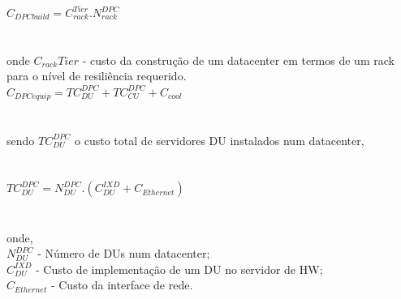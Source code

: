 \documentclass[t]{beamer}
\begin{document}
{%
\begin{frame}
$C_{DPCbuild} = C_{rack}^{Tier} . N_{rack}^{DPC}$\\
\\~\\
onde $C_{rack}{Tier}$ - custo da construção de um datacenter em termos de um rack para o nível de resiliência requerido.\\
\vspace{0.5cm}
$C_{DPCequip} = TC_{DU}^{DPC} + TC_{CU}^{DPC} + C_{cool}$\\
\\~\\sendo $TC_{DU}^{DPC} $ o custo total de servidores DU instalados num datacenter,\\
\\~\\
$TC_{DU}^{DPC} = N_{DU}^{DPC}.(C_{DU}^{IXD} + C_{Ethernet})$\\
\\~\\
onde,\\
 $N_{DU}^{DPC}$ - Número de DUs num datacenter;\\
 $C_{DU}^{IXD} $ - Custo de implementação de um DU no servidor de HW;\\
 $C_{Ethernet}$ - Custo da interface de rede.\\
 \end{frame}
 
}
\end{document}
